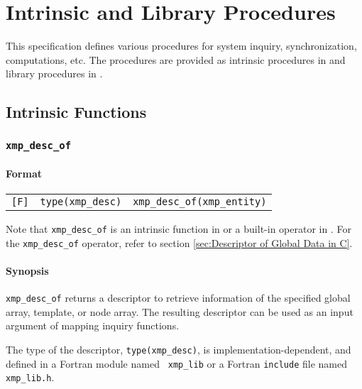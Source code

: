 \chapter{Intrinsic and Library Procedures}
\label{chap:Intrinsic and library procedures}

This specification defines various procedures for system inquiry,
synchronization, computations, etc. The procedures are provided as
intrinsic procedures in {\XMPF} and library procedures in {\XMPC}.

\section{Intrinsic Functions}

\subsection{{\tt xmp\_desc\_of}}
\label{subsec: xmp_desc_of}

\subsubsection*{Format}

\begin{tabular}{lll}

\verb![F]!&  {\tt type(xmp\_desc)}& {\tt xmp\_desc\_of(xmp\_entity)}\\

\end{tabular}

\vspace{0.3cm}

Note that {\tt xmp\_desc\_of} is an intrinsic function in {\XMPF} or
a built-in operator in {\XMPC}. For the {\tt xmp\_desc\_of} operator,
refer to section \ref{sec:Descriptor of Global Data in C}.

\subsubsection*{Synopsis}

{\tt xmp\_desc\_of} returns a descriptor to retrieve information of the
specified global array, template, or node array. The resulting
descriptor can be used as an input argument of mapping inquiry functions.

The type of the descriptor, {\tt type(xmp\_desc)}, is
implementation-dependent, and defined in a Fortran module named {\tt
xmp\_lib} or a Fortran {\tt include} file named {\tt xmp\_lib.h}.

